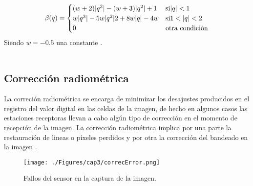 \begin{itemize}
		    		\begin{equation}\label{ec:interCubica}
		    		\beta(q) = \begin{cases}
		    		(w+2)\abs{q^{3}}-(w+3)\abs{q^{2}}+1 & \text{si} \abs{q} < 1 \\
		    		w\abs{q^{3}}-5w\abs{q^{2}}2+8w\abs{q}-4w & \text{si} 1 < \abs{q} < 2\\
		    		0 & \text{otra condici\'on}
		    		\end{cases}
		    		\end{equation}
		    		Siendo $ w=-0.5 $ una constante \cite{guide1999erdas}.\\~\\

	\end{itemize}
\subsection{Correcci\'on radiom\'etrica}
La correci\'on radiom\'etrica se encarga de minimizar los desajustes producidos en el registro del valor digital en las celdas de la imagen, de hecho en algunos casos las estaciones receptoras llevan a cabo alg\'un tipo de correcci\'on en el momento de recepci\'on de la imagen. La corrección radiom\'etrica implica por una parte la restauraci\'on de lineas o p\'ixeles perdidos y por otra la correcci\'on del bandeado en la imagen \cite{teledUm}.
    \begin{figure}[H]
    	\centering
    	\texttt{[image: ./Figures/cap3/correcError.png]}
    	\caption{Fallos del sensor en la captura de la imagen.}
    	\label{fig:correcError}
    \end{figure}

